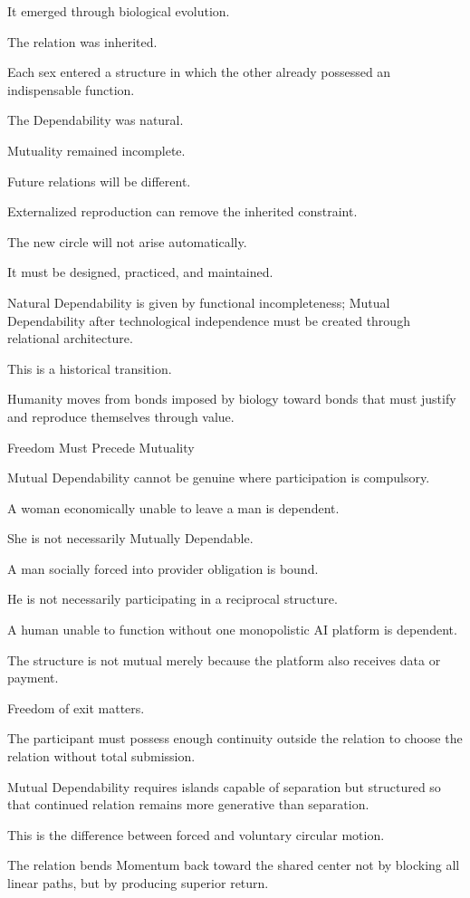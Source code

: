 It emerged through biological evolution.

The relation was inherited.

Each sex entered a structure in which the other already possessed an indispensable function.

The Dependability was natural.

Mutuality remained incomplete.

Future relations will be different.

Externalized reproduction can remove the inherited constraint.

The new circle will not arise automatically.

It must be designed, practiced, and maintained.

Natural Dependability is given by functional incompleteness; Mutual Dependability after technological independence must be created through relational architecture.

This is a historical transition.

Humanity moves from bonds imposed by biology toward bonds that must justify and reproduce themselves through value.

Freedom Must Precede Mutuality

Mutual Dependability cannot be genuine where participation is compulsory.

A woman economically unable to leave a man is dependent.

She is not necessarily Mutually Dependable.

A man socially forced into provider obligation is bound.

He is not necessarily participating in a reciprocal structure.

A human unable to function without one monopolistic AI platform is dependent.

The structure is not mutual merely because the platform also receives data or payment.

Freedom of exit matters.

The participant must possess enough continuity outside the relation to choose the relation without total submission.

Mutual Dependability requires islands capable of separation but structured so that continued relation remains more generative than separation.

This is the difference between forced and voluntary circular motion.

The relation bends Momentum back toward the shared center not by blocking all linear paths, but by producing superior return.

